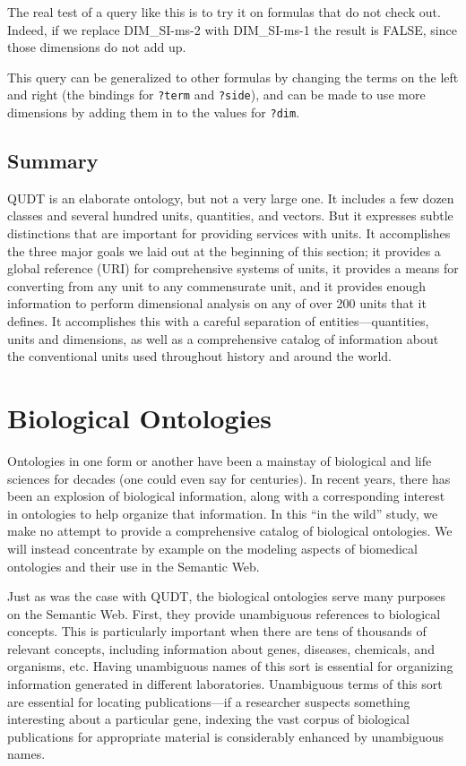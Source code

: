 The real test of a query like this is to try it on formulas that do not
check out. Indeed, if we replace DIM\_SI-ms-2 with DIM\_SI-ms-1 the result 
is FALSE, since those dimensions do not
add up.

This query can be generalized to other formulas by changing the terms on 
the left and right (the bindings for \texttt{?term} and \texttt{?side}), and can
be made to use more dimensions by adding them in to the values for \texttt{?dim}.




\subsection{Summary}

QUDT is an elaborate ontology, but not a very large one. It includes a
few dozen classes and several hundred units, quantities, and vectors.
But it expresses subtle distinctions that are important for providing
services with units. It accomplishes the three major goals we laid out
at
the beginning of this section; it provides a global reference (URI) for
comprehensive systems of units, it provides a means for converting from
any unit to any commensurate unit, and it provides enough information to
perform dimensional analysis on any of over 200 units that it defines.
It accomplishes this with a careful separation of entities---quantities,
units and dimensions, as well as a comprehensive catalog of information
about the conventional units used throughout history and around the
world.

\section{Biological Ontologies}
\label{section:Bio}

Ontologies in one form or another have been a mainstay of biological and
life sciences for decades (one could even say for centuries). In recent
years, there has been an explosion of biological information, along with
a corresponding interest in ontologies to help organize that
information. In this ``in the wild'' study, we make no attempt to
provide a comprehensive catalog of biological ontologies. We will
instead concentrate by example on the modeling aspects of biomedical
ontologies and their use in the Semantic Web.

Just as was the case with QUDT, the biological ontologies serve many
purposes on the Semantic Web. First, they provide unambiguous references
to biological concepts. This is particularly important when there are
tens of thousands of relevant concepts, including information about
genes, diseases, chemicals, and organisms, etc. Having unambiguous names
of this sort is essential for organizing information generated in
different laboratories. Unambiguous terms of this sort are essential for
locating publications---if a researcher suspects something interesting
about a particular gene, indexing the vast corpus of biological
publications for appropriate material is considerably enhanced by
unambiguous names.

